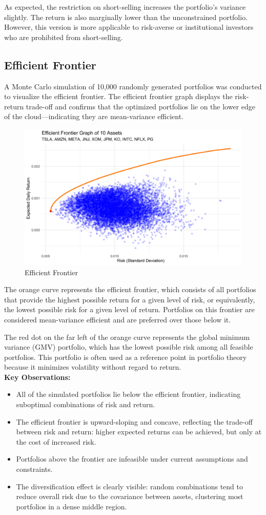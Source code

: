 \documentclass[12pt]{article}
\begin{document}
As expected, the restriction on short-selling increases the portfolio's variance slightly. The return is also marginally lower than the unconstrained portfolio. However, this version is more applicable to risk-averse or institutional investors who are prohibited from short-selling.

\subsection*{Efficient Frontier}
A Monte Carlo simulation of 10,000 randomly generated portfolios was conducted to visualize the efficient frontier. The efficient frontier graph displays the risk-return trade-off and confirms that the optimized portfolios lie on the lower edge of the cloud—indicating they are mean-variance efficient.
\begin{figure}[H]
    \centering
    \includegraphics[width=0.6\linewidth]{Findings_Yutong/efficient_frontier_plot.png}
    \caption{Efficient Frontier}
    \label{eff-fro}
\end{figure}
The orange curve represents the efficient frontier, which consists of all portfolios that provide the highest possible return for a given level of risk, or equivalently, the lowest possible risk for a given level of return. Portfolios on this frontier are considered mean-variance efficient and are preferred over those below it.\par
The red dot on the far left of the orange curve represents the global minimum variance (GMV) portfolio, which has the lowest possible risk among all feasible portfolios. This portfolio is often used as a reference point in portfolio theory because it minimizes volatility without regard to return.\\
\textbf{Key Observations:}
\begin{itemize}
    \item All of the simulated portfolios lie below the efficient frontier, indicating suboptimal combinations of risk and return.
    \item The efficient frontier is upward-sloping and concave, reflecting the trade-off between risk and return: higher expected returns can be achieved, but only at the cost of increased risk.
    \item Portfolios above the frontier are infeasible under current assumptions and constraints.
    \item The diversification effect is clearly visible: random combinations tend to reduce overall risk due to the covariance between assets, clustering most portfolios in a dense middle region.
\end{itemize}
\end{document}

